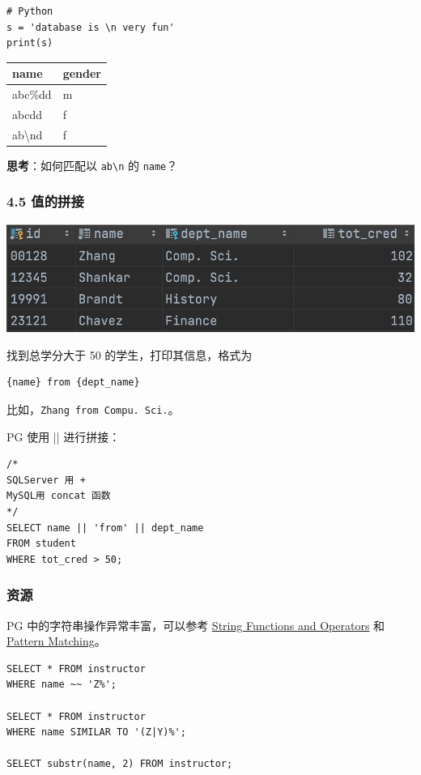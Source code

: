 \documentclass[aspectratio=169, 14pt]{beamer}
\begin{document}
\begin{frame}[fragile]
    \begin{verbatim} 
# Python
s = 'database is \n very fun'
print(s)
    \end{verbatim}
    \pause
    \begin{table}
        \begin{tabular}{ll}
          \toprule
          name & gender \\
          \midrule
          abc\%dd & m \\
          abcdd & f \\
          ab\textbackslash nd & f \\
          \bottomrule
        \end{tabular}
    \end{table}
{\large {}} \textbf{思考}：如何匹配以 \texttt{ab\textbackslash n} 的 \texttt{name}？
\end{frame}

\begin{frame}[fragile]
    \frametitle{4.5 值的拼接}
\includegraphics[width=.8\textwidth]{week4/cred}    

找到总学分大于 50 的学生，打印其信息，格式为

\begin{verbatim}
{name} from {dept_name}    
\end{verbatim}

比如，\texttt{Zhang from Compu. Sci.}。
\end{frame}

\begin{frame}[fragile]
PG 使用 \alert{||} 进行拼接：
    \begin{verbatim} 
/*
SQLServer 用 +
MySQL用 concat 函数
*/
SELECT name || 'from' || dept_name
FROM student
WHERE tot_cred > 50;
    \end{verbatim}

\end{frame}

\begin{frame}[fragile]
    \frametitle{资源}
PG 中的字符串操作异常丰富，可以参考 \href{https://www.postgresql.org/docs/14/functions-string.html}{String Functions and Operators} 和 \href{https://www.postgresql.org/docs/14/functions-matching.html}{Pattern Matching}。

\begin{verbatim} 
SELECT * FROM instructor
WHERE name ~~ 'Z%';

SELECT * FROM instructor
WHERE name SIMILAR TO '(Z|Y)%';

SELECT substr(name, 2) FROM instructor;
\end{verbatim}

\end{frame}
\end{document}
